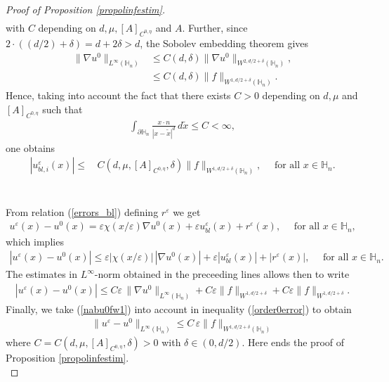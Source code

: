 \documentclass[11pt, reqno]{amsart}
\theoremstyle{definition}
\theoremstyle{remark}
\numberwithin{equation}{section}
\begin{document}
\begin{proof}[Proof of Proposition \textup{\ref{propolinfestim}}]
\begin{align}
		\end{align}
		with $C$  depending on $ d,\mu,[A]_{C^{0,\eta}}$ and $A$.
		Further, since $2\cdot ((d/2 )+ \delta)= d+2\delta > d$, the Sobolev embedding theorem gives 
		\begin{align}
			\|\nabla u^0\|_{L^\infty(\mathbb{H}_n)} &\leq C(d,\delta) \|\nabla u^0\|_{W^{2,d/2+\delta}(\mathbb{H}_n)},\nonumber\\
			&\leq C(d,\delta) \|f\|_{W^{1,d/2+\delta}(\mathbb{H}_n)} \label{nabu0fw1}.
		\end{align}	
		Hence, taking into account the fact that there exists $C>0$ depending on $d, \mu$ and $[A]_{C^{0,\eta}}$ such that
		\begin{align}\label{bound_int|y-tildy|^d}
			\int_{\partial\mathbb{H}_n}  \frac{x\cdot n}{|x-\tilde{x}|^d} \,  d\tilde{x}\leq C <\infty ,
		\end{align}
		one obtains			\begin{align}
			|	u^\varepsilon_{bl,i} (x)|\leq& \,  C(d,\mu, [A]_{C^{0,\eta}},\delta) \|f\|_{W^{1,d/2+\delta}(\mathbb{H}_n)},\quad\mbox{ for all }x\in\mathbb{H}_n  .\\\nonumber
		\end{align}
		
		
		\\
		From relation (\ref{errors_bl}) defining $r^\varepsilon$ we get 
		\begin{align*}
			u^\varepsilon(x) -u^0(x)= \varepsilon \chi(x/ \varepsilon) \nabla u^0(x)+\varepsilon u^\varepsilon_{bl}(x)+r^\varepsilon(x), \quad \mbox{ for all }x\in \mathbb{H}_n,
		\end{align*}
		which implies 
		\begin{align*}
			|u^\varepsilon(x) -u^0(x)| \leq  \varepsilon |\chi(x/ \varepsilon)|\,|\nabla u^0(x)|+\varepsilon |u^\varepsilon_{bl}(x)|+|r^\varepsilon(x)|, \quad \mbox{ for all }x\in \mathbb{H}_n.
		\end{align*}
		The estimates in $L^\infty$-norm obtained in the preceeding lines  allows then to write
		\begin{align}\label{order0error}
			|u^\varepsilon(x) -u^0(x)| \leq  C \varepsilon \,\|\nabla u^0\|_{L^\infty(\mathbb{H}_n)}+ C  \varepsilon\|f\|_{W^{1,d/2+\delta}} +C\varepsilon\|f\|_{W^{1,d/2+\delta}} .
		\end{align}
		Finally, we take (\ref{nabu0fw1}) into account in inequality (\ref{order0error}) to obtain
		\begin{align}
			\|u^\varepsilon -u^0 \|_{L^\infty(\mathbb{H}_n)} \leq  C  \, \varepsilon\|f\|_{W^{1,d/2+\delta}(\mathbb{H}_n)} 
		\end{align}
		where 	$C= C(d,\mu,[A]_{C^{0,\eta}},\delta )>0$	with  $\delta\in(0,d/2)$.
		Here ends the proof of Proposition \ref{propolinfestim}.\qedhere\\
	\end{proof}
	
\end{document}
